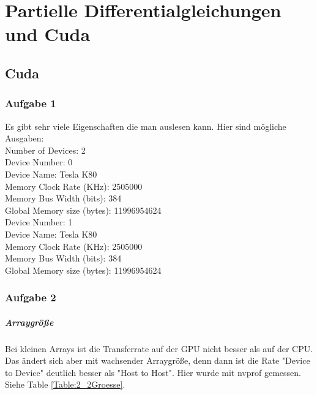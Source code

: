 \documentclass{report}
\begin{document}
\newpage

\chapter{Partielle Differentialgleichungen und Cuda}
\section{Cuda}
\subsection{Aufgabe 1}

Es gibt sehr viele Eigenschaften die man auslesen kann. Hier sind mögliche Ausgaben: \\

Number of Devices: 2\\
Device Number:                0\\
Device Name:                  Tesla K80\\
Memory Clock Rate (KHz):      2505000\\
Memory Bus Width (bits):      384\\
Global Memory size (bytes):   11996954624\\
Device Number:                1\\
Device Name:                  Tesla K80\\
Memory Clock Rate (KHz):      2505000\\
Memory Bus Width (bits):      384\\
Global Memory size (bytes):   11996954624\\

\subsection{Aufgabe 2}

\paragraph{Arraygröße} Bei kleinen Arrays ist die Transferrate auf der GPU nicht besser als auf der CPU. Das ändert sich aber mit wachsender Arraygröße, denn dann ist die Rate "Device to Device" deutlich besser als "Host to Host".
Hier wurde mit nvprof gemessen. Siehe Table \ref{Table:2_2Groesse}.
\end{document}

